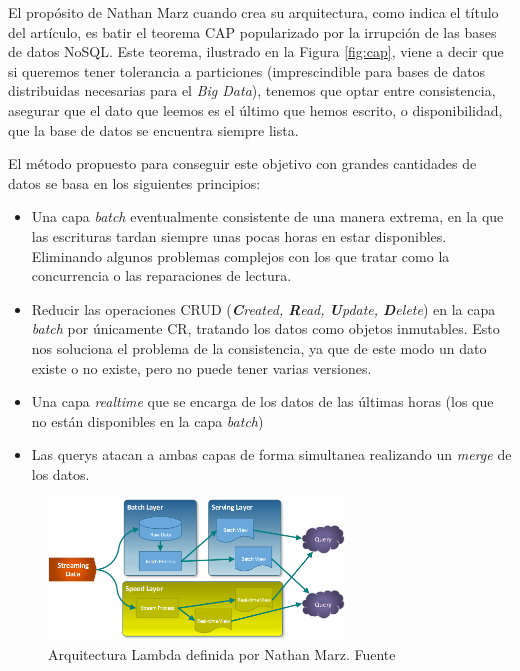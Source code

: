 El propósito de Nathan Marz cuando crea su arquitectura, como indica el título del artículo, es batir el teorema CAP popularizado por la irrupción de las bases de datos NoSQL. Este teorema, ilustrado en la Figura \ref{fig:cap}, viene a decir que si queremos tener tolerancia a particiones (imprescindible para bases de datos distribuidas necesarias para el \textit{Big Data}), tenemos que optar entre consistencia, asegurar que el dato que leemos es el último que hemos escrito, o disponibilidad, que la base de datos se encuentra siempre lista.



El método propuesto para conseguir este objetivo con grandes cantidades de datos se basa en los siguientes principios:

\begin{itemize}
	\item Una capa \textit{batch} eventualmente consistente de una manera extrema, en la que las escrituras tardan siempre unas pocas horas en estar disponibles. Eliminando algunos problemas complejos con los que tratar como  la concurrencia o las reparaciones de lectura. 
	\item Reducir las operaciones CRUD (\textit{\textbf{C}reated, \textbf{R}ead, \textbf{U}pdate, \textbf{D}elete}) en la capa \textit{batch} por únicamente CR, tratando los datos como objetos inmutables. Esto nos soluciona el problema de la consistencia, ya que de este modo un dato existe o no existe, pero no puede tener varias versiones. 
	\item Una capa \textit{realtime} que se encarga de los datos de las últimas horas (los que no están disponibles en la capa \textit{batch})
	\item Las querys atacan a ambas capas de forma simultanea realizando un \textit{merge} de los datos.
	
\end{itemize}

\begin{figure}[!ht]
	\centering
	\includegraphics[width=0.70\textwidth]{images/arte/lambda}
	\caption{Arquitectura Lambda definida por   Nathan Marz. Fuente \cite{lambdakappa}}
	\label{fig:lambda}
\end{figure}



